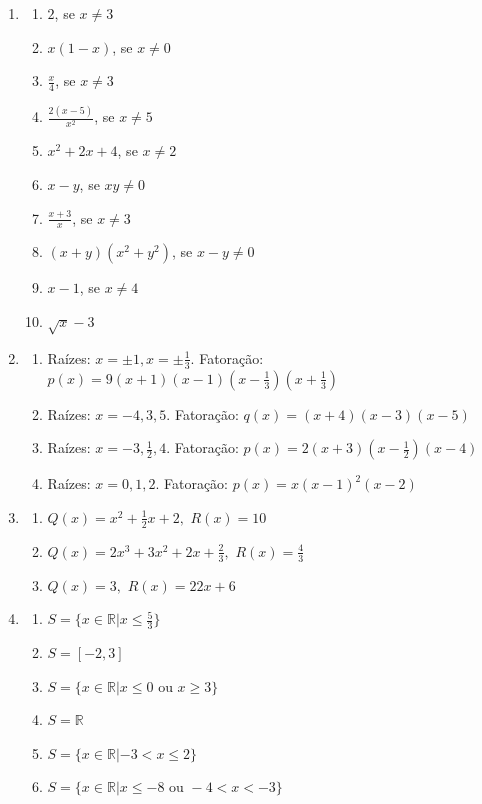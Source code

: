 \begin{enumerate}
\item
    \begin{enumerate}
        \item $2$, se $x \neq 3$
        \item $x(1-x)$, se $x \neq 0$
        \item $\frac{x}{4}$, se $x \neq 3$
        \item $\frac{2(x-5)}{x^2}$, se $x \neq 5$
        \item $x^2+2x+4$, se $x \neq 2$
        \item $x-y$, se $xy \neq 0$
        \item $\frac{x+3}{x}$, se $x \neq 3$
        \item $(x+y)(x^2+y^2)$, se $x-y \neq 0$
        \item $x-1$, se $x \neq 4$
        \item $\sqrt{x}-3$
    \end{enumerate}

\item
    \begin{enumerate}
        \item Raízes: $x=\pm 1, x=\pm \frac{1}{3}$. Fatoração: $p(x)=9(x+1)(x-1)(x-\frac{1}{3})(x+\frac{1}{3})$
        \item Raízes: $x=-4, 3, 5$. Fatoração: $q(x)=(x+4)(x-3)(x-5)$
        \item Raízes: $x=-3, \frac{1}{2}, 4$. Fatoração: $p(x)=2(x+3)(x-\frac{1}{2})(x-4)$
        \item Raízes: $x=0, 1, 2$. Fatoração: $p(x)=x(x-1)^2(x-2)$
    \end{enumerate}

\item
    \begin{enumerate}
        \item $Q(x)=x^2+ \frac{1}{2}x+2, \,\, R(x)=10$
        \item $Q(x)=2x^3+ 3x^2+2x+\frac{2}{3}, \,\, R(x)=\frac{4}{3}$
        \item $Q(x)=3, \,\, R(x)=22x+6$
    \end{enumerate}

\item
    \begin{enumerate}
        \item $S=\{ x \in \mathbb{R}| x \leq \frac{5}{3} \}$
        \item $S=[-2,3]$
        \item $S=\{ x \in \mathbb{R}| x \leq 0 \,\, \text{ou} \,\, x \geq 3 \}$
        \item $S= \mathbb{R}$
        \item $S=\{ x \in \mathbb{R}|-3< x \leq 2 \}$
        \item $S=\{ x \in \mathbb{R}| x \leq -8 \,\, \text{ou} \,\, -4<x<-3 \}$
    \end{enumerate}

\end{enumerate}